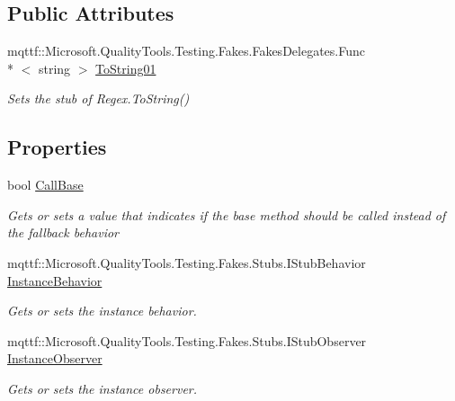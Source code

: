 \subsection*{Public Attributes}
\begin{DoxyCompactItemize}
\item 
mqttf\-::\-Microsoft.\-Quality\-Tools.\-Testing.\-Fakes.\-Fakes\-Delegates.\-Func\\*
$<$ string $>$ \hyperlink{class_system_1_1_text_1_1_regular_expressions_1_1_fakes_1_1_stub_regex_a5bd5632b5176ba46c5579d0dc9d4bb1f}{To\-String01}
\begin{DoxyCompactList}\small\item\em Sets the stub of Regex.\-To\-String()\end{DoxyCompactList}\end{DoxyCompactItemize}
\subsection*{Properties}
\begin{DoxyCompactItemize}
\item 
bool \hyperlink{class_system_1_1_text_1_1_regular_expressions_1_1_fakes_1_1_stub_regex_aa3999a3ad473f15a1e2f1d29d777215a}{Call\-Base}
\begin{DoxyCompactList}\small\item\em Gets or sets a value that indicates if the base method should be called instead of the fallback behavior\end{DoxyCompactList}\item 
mqttf\-::\-Microsoft.\-Quality\-Tools.\-Testing.\-Fakes.\-Stubs.\-I\-Stub\-Behavior \hyperlink{class_system_1_1_text_1_1_regular_expressions_1_1_fakes_1_1_stub_regex_a2dfa25cfcb4b303f082bdead9dc8b108}{Instance\-Behavior}
\begin{DoxyCompactList}\small\item\em Gets or sets the instance behavior.\end{DoxyCompactList}\item 
mqttf\-::\-Microsoft.\-Quality\-Tools.\-Testing.\-Fakes.\-Stubs.\-I\-Stub\-Observer \hyperlink{class_system_1_1_text_1_1_regular_expressions_1_1_fakes_1_1_stub_regex_a5babb41cd91a6c02ea937b506183a9f6}{Instance\-Observer}
\begin{DoxyCompactList}\small\item\em Gets or sets the instance observer.\end{DoxyCompactList}\end{DoxyCompactItemize}


